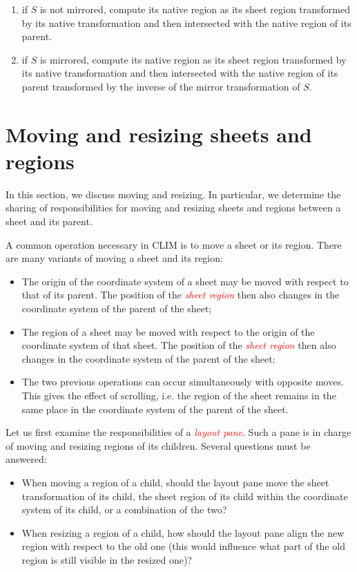 \documentclass{article}
\newenvironment{itemize0}{
\begin{itemize}
\setlength{\parskip}{0cm}%
}
{\end{itemize}}
\newenvironment{enumerate0}{
\begin{enumerate}
\setlength{\parskip}{0cm}%
}
{\end{enumerate}}
\newcommand{\gloss}[1]{\textsl{\textcolor{red}{#1}}}
\begin{document}
\begin{enumerate0}
\item if $S$ is not mirrored, compute its native region as its sheet
region transformed by its native transformation and then intersected
with the native region of its parent.
\item if $S$ is mirrored, compute its native region as its sheet
region transformed by its native transformation and then intersected
with the native region of its parent transformed by the inverse of the
mirror transformation of $S$.
\end{enumerate0}

\section{Moving and resizing sheets and regions}
\label{secmoving}

In this section, we discuss moving and resizing.  In particular, we
determine the sharing of responsibilities for moving and resizing
sheets and regions between a sheet and its parent. 

A common operation necessary in CLIM is to move a sheet or
its region.  There are many variants of moving a sheet and its
region:

\begin{itemize0}
\item The origin of the coordinate system of a sheet may be moved with
respect to that of its parent.  The position of the \gloss{sheet
region} then also changes in the coordinate system of the parent of
the sheet;
\item The region of a sheet may be moved with respect to the origin of
the coordinate system of that sheet.  The position of the \gloss{sheet
region} then also changes in the coordinate system of the parent of
the sheet;
\item The two previous operations can occur simultaneously with
opposite moves.  This gives the effect of scrolling, i.e. the region
of the sheet remains in the same place in the coordinate system of the
parent of the sheet.
\end{itemize0}

Let us first examine the responsibilities of a \gloss{layout pane}.
Such a pane is in charge of moving and resizing regions of its
children.  Several questions must be answered:

\begin{itemize0}
\item When moving a region of a child, should the layout pane move
the sheet transformation of its child, the sheet region of its child
within the coordinate system of its child, or a combination of the
two?
\item When resizing a region of a child, how should the layout pane
align the new region with respect to the old one (this would influence
what part of the old region is still visible in the resized one)?
\end{itemize0}
\end{document}
